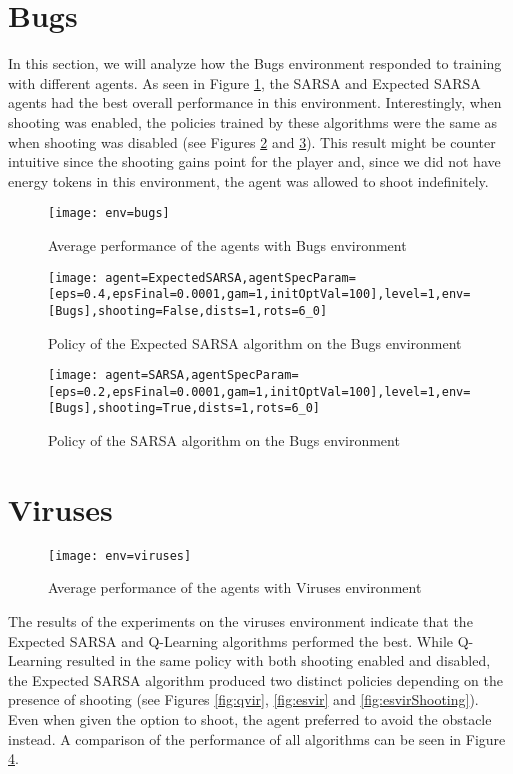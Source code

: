 \section{Bugs}
In this section, we will analyze how the Bugs environment responded to training with different agents. As seen in Figure \ref{fig:avgbugs}, the SARSA and Expected SARSA agents had the best overall performance in this environment. Interestingly, when shooting was enabled, the policies trained by these algorithms were the same as when shooting was disabled (see Figures \ref{fig:polexps} and \ref{fig:pols}). This result might be counter intuitive since the shooting gains point for the player and, since we did not have energy tokens in this environment, the agent was allowed to shoot indefinitely.

\begin{figure}[h]
    \centering
    \texttt{[image: env=bugs]}
    \caption{Average performance of the agents with Bugs environment}
    \label{fig:avgbugs}
\end{figure}

\begin{figure}[h]
    \centering
    \texttt{[image: agent=ExpectedSARSA,agentSpecParam=[eps=0.4,epsFinal=0.0001,gam=1,initOptVal=100],level=1,env=[Bugs],shooting=False,dists=1,rots=6\_0]}
    \caption{Policy of the Expected SARSA algorithm on the Bugs environment}
    \label{fig:polexps}
\end{figure}

\begin{figure}[h]
    \centering
    \texttt{[image: agent=SARSA,agentSpecParam=[eps=0.2,epsFinal=0.0001,gam=1,initOptVal=100],level=1,env=[Bugs],shooting=True,dists=1,rots=6\_0]}
    \caption{Policy of the SARSA algorithm on the Bugs environment}
    \label{fig:pols}
\end{figure}

\section{Viruses}
\begin{figure}[h]
    \centering
    \texttt{[image: env=viruses]}
    \caption{Average performance of the agents with Viruses environment}
    \label{fig:avgviruses}
\end{figure}

The results of the experiments on the viruses environment indicate that the Expected SARSA and Q-Learning algorithms performed the best. While Q-Learning resulted in the same policy with both shooting enabled and disabled, the Expected SARSA algorithm produced two distinct policies depending on the presence of shooting (see Figures \ref{fig:qvir}, \ref{fig:esvir} and \ref{fig:esvirShooting}). Even when given the option to shoot, the agent preferred to avoid the obstacle instead. A comparison of the performance of all algorithms can be seen in Figure \ref{fig:avgviruses}.



